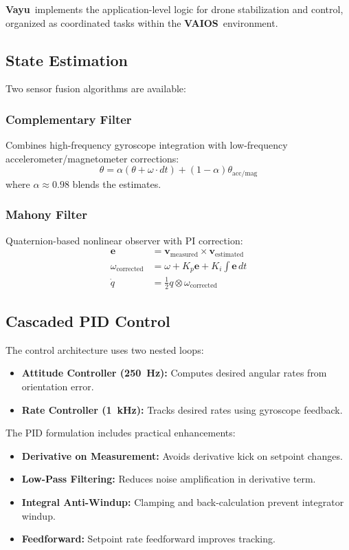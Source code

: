 \documentclass[11pt]{article}
\newcommand{\vayuname}{\textbf{Vayu}}
\newcommand{\vaios}{\textbf{VAIOS}}
\begin{document}
\vayuname~implements the application-level logic for drone stabilization and control, organized as coordinated tasks within the \vaios~environment.

\subsection{State Estimation}

Two sensor fusion algorithms are available:

\subsubsection{Complementary Filter}
Combines high-frequency gyroscope integration with low-frequency accelerometer/magnetometer corrections:
\[
\theta = \alpha(\theta + \omega \cdot dt) + (1-\alpha)\theta_{\text{acc/mag}}
\]
where $\alpha \approx 0.98$ blends the estimates.

\subsubsection{Mahony Filter}
Quaternion-based nonlinear observer with PI correction:
\begin{align*}
\mathbf{e} &= \mathbf{v}_{\text{measured}} \times \mathbf{v}_{\text{estimated}} \\
\omega_{\text{corrected}} &= \omega + K_p\mathbf{e} + K_i\int \mathbf{e}\,dt \\
\dot{q} &= \frac{1}{2} q \otimes \omega_{\text{corrected}}
\end{align*}

\subsection{Cascaded PID Control}

The control architecture uses two nested loops:

\begin{itemize}[leftmargin=*]
    \item \textbf{Attitude Controller (250~Hz):} Computes desired angular rates from orientation error.
    \item \textbf{Rate Controller (1~kHz):} Tracks desired rates using gyroscope feedback.
\end{itemize}

The PID formulation includes practical enhancements:
\begin{itemize}[leftmargin=*]
    \item \textbf{Derivative on Measurement:} Avoids derivative kick on setpoint changes.
    \item \textbf{Low-Pass Filtering:} Reduces noise amplification in derivative term.
    \item \textbf{Integral Anti-Windup:} Clamping and back-calculation prevent integrator windup.
    \item \textbf{Feedforward:} Setpoint rate feedforward improves tracking.
\end{itemize}
\end{document}
